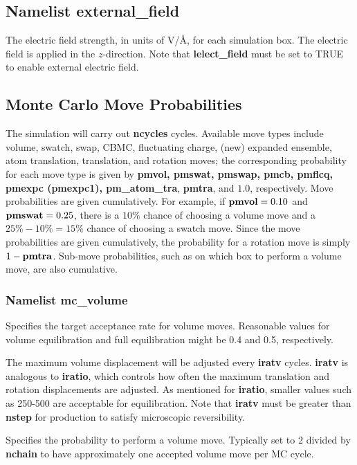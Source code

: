 \documentclass[12pt,letterpaper]{article}
\begin{document}
\subsection{Namelist \textbf{external\_field}}
 The electric field strength, in
units of V/\AA, for each simulation box. The electric field
is applied in the $z$-direction. Note that {\bf
  lelect\_field} must be set to TRUE to enable external
electric field.

\subsection{Monte Carlo Move Probabilities}
The simulation will carry out {\bf ncycles} cycles.
Available move types include volume, swatch, swap, CBMC,
fluctuating charge, (new) expanded ensemble, atom
translation, translation, and rotation moves; the
corresponding probability for each move type is given by
{\bf pmvol, pmswat, pmswap, pmcb, pmflcq, pmexpc (pmexpc1),
  pm\_atom\_tra}, {\bf pmtra}, and $1.0$, respectively. Move
probabilities are given cumulatively. For example, if ${\bf
  pmvol} = 0.10$ and ${\bf pmswat} = 0.25$, there is a
$10\%$ chance of choosing a volume move and a $25\%-10\% =
15\%$ chance of choosing a swatch move. Since the move
probabilities are given cumulatively, the probability for a
rotation move is simply $1 - {\bf pmtra}$. Sub-move
probabilities, such as on which box to perform a volume
move, are also cumulative.

\subsubsection{Namelist \textbf{mc\_volume}}
 Specifies the target acceptance rate
for volume moves. Reasonable values for volume equilibration
and full equilibration might be 0.4 and 0.5, respectively.

 The maximum volume displacement will
be adjusted every {\bf iratv} cycles. {\bf iratv} is
analogous to {\bf iratio}, which controls how often the
maximum translation and rotation displacements are adjusted.
As mentioned for {\bf iratio}, smaller values such as
250-500 are acceptable for equilibration. Note that {\bf
  iratv} must be greater than {\bf nstep} for production to
satisfy microscopic reversibility.

 Specifies the probability to perform a
volume move. Typically set to 2 divided by {\bf nchain} to
have approximately one accepted volume move per MC cycle.
\end{document}
